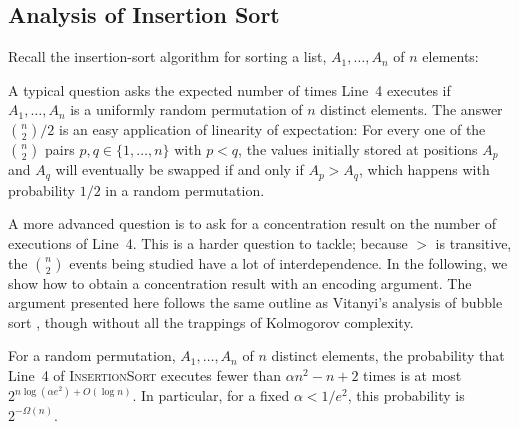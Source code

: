 \documentclass{patmorin}
\begin{document}
\subsection{Analysis of Insertion Sort}

Recall the insertion-sort algorithm for sorting a list, $A_1,\ldots,A_n$
of $n$ elements:

\begin{algorithmic}[1]
     \ENDWHILE
  \ENDFOR
\end{algorithmic}

A typical question asks the expected number of times Line~4 executes
if $A_1,\ldots,A_n$ is a uniformly random permutation of $n$ distinct
elements.  The answer $\binom{n}{2}/2$ is an easy application of
linearity of expectation: For every one of the $\binom{n}{2}$ pairs
$p,q\in\{1,\ldots,n\}$ with $p<q$, the values initially stored at
positions $A_p$ and $A_q$ will eventually be swapped if and only if $A_p >
A_q$, which happens with probability $1/2$ in a random permutation.

A more advanced question is to ask for a concentration result on the
number of executions of Line~4. This is a harder question to tackle;
because $>$ is transitive, the $\binom{n}{2}$ events being studied have
a lot of interdependence. In the following, we show how to obtain a
concentration result with an encoding argument.  The argument presented
here follows the same outline as Vitanyi's analysis of bubble sort
\cite{vitanyi:analysis}, though without all the trappings of Kolmogorov complexity.

\begin{thm}
  For a random permutation, $A_1,\ldots,A_n$ of $n$ distinct elements,
  the probability that Line~4 of \textsc{InsertionSort} executes fewer
  than $\alpha n^2 - n + 2$ times is at most $2^{n\log(\alpha e^2)+O(\log
  n)}$.  In particular, for a fixed $\alpha < 1/e^2$, this probability
  is $2^{-\Omega(n)}$.
\end{thm}
\end{document}
